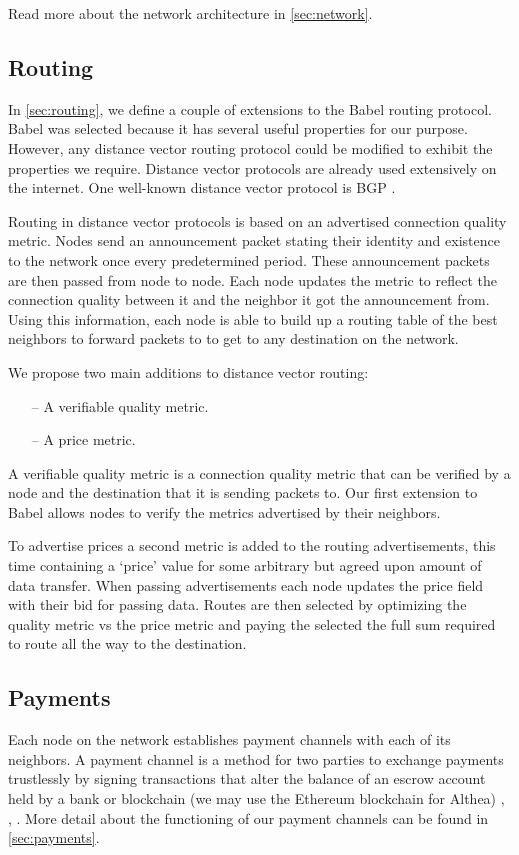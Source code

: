 \documentclass[11pt]{article}
\newlength{\currentparskip}
\newenvironment{unbreakable}
  {\setlength{\currentparskip}{\parskip}%
	 \vspace{\currentparskip}
   \begin{minipage}{\textwidth}%
   \setlength{\parskip}{\currentparskip}%
  }
  {\end{minipage}\vspace{\currentparskip}}
\begin{document}
Read more about the network architecture in \autoref{sec:network}.

\subsection{Routing}
In \autoref{sec:routing}, we define a couple of extensions to the Babel routing protocol. Babel was selected because it has several useful properties for our purpose. However, any distance vector routing protocol could be modified to exhibit the properties we require. Distance vector protocols are already used extensively on the internet. One well-known distance vector protocol is BGP \cite{bgp}.
 
Routing in distance vector protocols is based on an advertised connection quality metric. Nodes send an announcement packet stating their identity and existence to the network once every predetermined period. These announcement packets are then passed from node to node. Each node updates the metric to reflect the connection quality between it and the neighbor it got the announcement from. Using this information, each node is able to build up a routing table of the best neighbors to forward packets to to get to any destination on the network.

\begin{unbreakable}
We propose two main additions to distance vector routing:
\begin{itemize}
\item[--] A verifiable quality metric.
\item[--] A price metric.
\end{itemize}
\end{unbreakable}

A verifiable quality metric is a connection quality metric that can be verified by a node and the destination that it is sending packets to. Our first extension to Babel allows nodes to verify the metrics advertised by their neighbors.
 
To advertise prices a second metric is added to the routing advertisements, this time containing a ‘price’ value for some arbitrary but agreed upon amount of data transfer. When passing advertisements each node updates the price field with their bid for passing data. Routes are then selected by optimizing the quality metric vs the price metric and paying the selected the full sum required to route all the way to the destination. 

\subsection{Payments}
Each node on the network establishes payment channels with each of its neighbors. A payment channel is a method for two parties to exchange payments trustlessly by signing transactions that alter the balance of an escrow account held by a bank or blockchain (we may use the Ethereum blockchain for Althea) \cite{btcwiki}, \cite{bitcoinj}, \cite{machinomy}. More detail about the functioning of our payment channels can be found in \autoref{sec:payments}.
 
\end{document}
